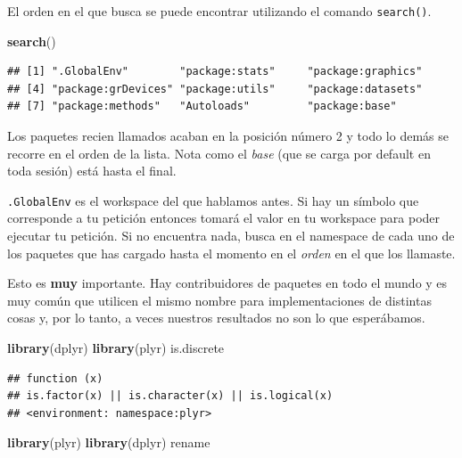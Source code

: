\documentclass[]{article}
\newenvironment{Shaded}{\begin{snugshade}}{\end{snugshade}}
\newcommand{\KeywordTok}[1]{\textcolor[rgb]{0.13,0.29,0.53}{\textbf{{#1}}}}
\newcommand{\NormalTok}[1]{{#1}}
\begin{document}
El orden en el que busca se puede encontrar utilizando el comando
\texttt{search()}.

\begin{Shaded}
\begin{Highlighting}[]
\KeywordTok{search}\NormalTok{()}
\end{Highlighting}
\end{Shaded}

\begin{verbatim}
## [1] ".GlobalEnv"        "package:stats"     "package:graphics" 
## [4] "package:grDevices" "package:utils"     "package:datasets" 
## [7] "package:methods"   "Autoloads"         "package:base"
\end{verbatim}

Los paquetes recien llamados acaban en la posición número 2 y todo lo
demás se recorre en el orden de la lista. Nota como el \emph{base} (que
se carga por default en toda sesión) está hasta el final.

\texttt{.GlobalEnv} es el workspace del que hablamos antes. Si hay un
símbolo que corresponde a tu petición entonces tomará el valor en tu
workspace para poder ejecutar tu petición. Si no encuentra nada, busca
en el namespace de cada uno de los paquetes que has cargado hasta el
momento en el \emph{orden} en el que los llamaste.

Esto es \textbf{muy} importante. Hay contribuidores de paquetes en todo
el mundo y es muy común que utilicen el mismo nombre para
implementaciones de distintas cosas y, por lo tanto, a veces nuestros
resultados no son lo que esperábamos.

\begin{Shaded}
\begin{Highlighting}[]
\KeywordTok{library}\NormalTok{(dplyr)}
\KeywordTok{library}\NormalTok{(plyr)}
\NormalTok{is.discrete}
\end{Highlighting}
\end{Shaded}

\begin{verbatim}
## function (x) 
## is.factor(x) || is.character(x) || is.logical(x)
## <environment: namespace:plyr>
\end{verbatim}

\begin{Shaded}
\begin{Highlighting}[]
\KeywordTok{library}\NormalTok{(plyr)}
\KeywordTok{library}\NormalTok{(dplyr)}
\NormalTok{rename}
\end{Highlighting}
\end{Shaded}
\end{document}
